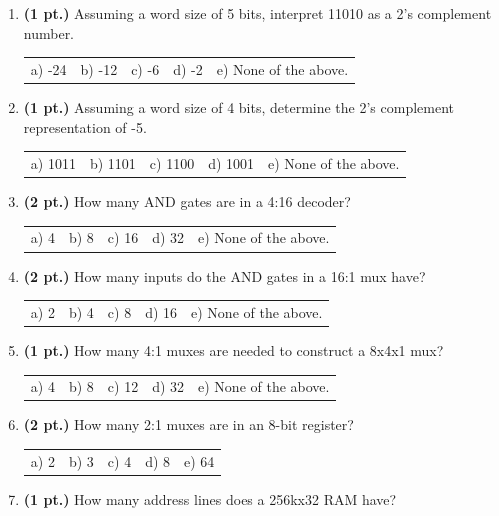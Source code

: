 \documentclass{article}
\begin{document}
\begin{enumerate}
\item {\bf (1 pt.)} Assuming a word size of 5 bits, interpret 11010 as a 2's complement
number.

\begin{tabular}{p{0.6in} p{0.6in} p{0.6in} p{0.6in} l}
a) -24 & b) -12 & c) -6 & d) -2 & e) None of the above.
\end{tabular}

\item {\bf (1 pt.)} Assuming a word size of 4 bits, determine the 2's complement
representation of -5.

\begin{tabular}{p{0.6in} p{0.6in} p{0.6in} p{0.6in} l}
a) 1011 & b) 1101 & c) 1100 & d) 1001 & e) None of the above.
\end{tabular}

\item {\bf (2 pt.)} How many AND gates are in a 4:16 decoder?

\begin{tabular}{p{0.6in} p{0.6in} p{0.6in} p{0.6in} l}
a) 4 & b) 8 & c) 16 & d) 32 & e) None of the above.
\end{tabular}


\item {\bf (2 pt.)} How many inputs do the AND gates in a 16:1 mux have?

\begin{tabular}{p{0.6in} p{0.6in} p{0.6in} p{0.6in} l}
a) 2 & b) 4 & c) 8 & d) 16 & e) None of the above.
\end{tabular}

\item {\bf (1 pt.)} How many 4:1 muxes are needed to construct a 8x4x1 mux?

\begin{tabular}{p{0.6in} p{0.6in} p{0.6in} p{0.6in} l}
a) 4 & b) 8 & c) 12 & d) 32 & e) None of the above.
\end{tabular}

\item {\bf (2 pt.)} How many 2:1 muxes are in an 8-bit register?

\begin{tabular}{p{0.6in} p{0.6in} p{0.6in} p{0.6in} l}
a) 2 & b) 3 & c) 4 & d) 8 & e) 64
\end{tabular}

\item {\bf (1 pt.)} How many address lines does a 256kx32 RAM have?


\end{enumerate}
\end{document}

